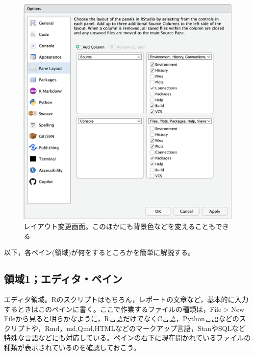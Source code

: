 \documentclass[
  a4paper,
]{ltjsbook}
\begin{document}
\begin{figure}

{\centering \includegraphics{Figs/01_PaneLayout.png}

}

\caption{レイアウト変更画面。このほかにも背景色などを変えることもできる}

\end{figure}

以下，各ペイン(領域)が何をするところかを簡単に解説する。

\hypertarget{ux9818ux57df1ux30a8ux30c7ux30a3ux30bfux30daux30a4ux30f3}{%
\subsection{領域1；エディタ・ペイン}\label{ux9818ux57df1ux30a8ux30c7ux30a3ux30bfux30daux30a4ux30f3}}

エディタ領域。Rのスクリプトはもちろん，レポートの文章など，基本的に入力するときはこのペインに書く。ここで作業するファイルの種類は，File
\textgreater{} New
Fileから見ると明らかなように，R言語だけでなくC言語，Python言語などのスクリプトや，Rmd，md,Qmd,HTMLなどのマークアップ言語，StanやSQLなど特殊な言語などにも対応している。ペインの右下に現在開かれているファイルの種類が表示されているのを確認しておこう。
\end{document}
